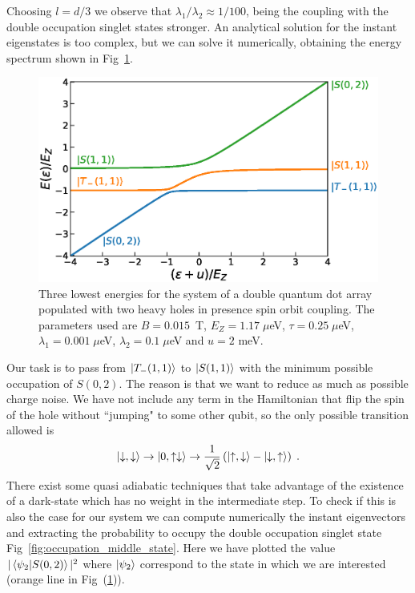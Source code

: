 \documentclass[a4paper,11pt]{article}
\begin{document}
Choosing $l=d/3$ we observe that $\lambda_1/\lambda_2\approx 1/100$, being the coupling with the double occupation singlet states stronger. An analytical solution for the instant eigenstates is too complex, but we can solve it numerically, obtaining the energy spectrum shown in Fig~\ref{fig:eigenenergies_2QD_2HH_w_SOC}.
\begin{figure}[!htbp]
	\centering
	\includegraphics[width=0.8\linewidth]{eigenenergies_2QD_2HH_w_SOC.eps}
	\caption{Three lowest energies for the system of a double quantum dot array populated with two heavy holes in presence spin orbit coupling. The parameters used are $B=0.015$~T, $E_Z=1.17\; \mu$eV, $\tau=0.25\; \mu$eV, $\lambda_1=0.001\; \mu$eV, $\lambda_2=0.1\; \mu$eV and $u=2$ meV.}
	\label{fig:eigenenergies_2QD_2HH_w_SOC}
\end{figure}
Our task is to pass from $\ket{T_-(1,1)}$ to $\ket{S(1,1)}$ with the minimum possible occupation of $S(0,2)$. The reason is that we want to reduce as much as possible charge noise. We have not include any term in the Hamiltonian that flip the spin of the hole without ``jumping" to some other qubit, so the only possible transition allowed is
\begin{equation}
	\ket{\downarrow,\downarrow}\rightarrow \ket{0,\uparrow\downarrow} \rightarrow \frac{1}{\sqrt{2}}\left(\ket{\uparrow,\downarrow}-\ket{\downarrow,\uparrow}\right)\; .
\end{equation}
There exist some quasi adiabatic techniques that take advantage of the existence of a dark-state which has no weight in the intermediate step. To check if this is also the case for our system we can compute numerically the instant eigenvectors and extracting the probability to occupy the double occupation singlet state Fig~\ref{fig:occupation_middle_state}. Here we have plotted the value $|\braket{\psi_2}{S(0,2)}|^2$ where $\ket{\psi_2}$ correspond to the state in which we are interested (orange line in Fig~(\ref{fig:eigenenergies_2QD_2HH_w_SOC})).
\end{document}
